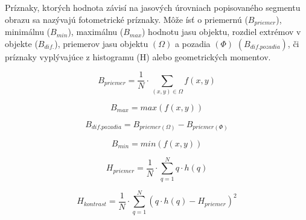         Príznaky, ktorých hodnota závisí na jasových úrovniach popisovaného segmentu obrazu sa nazývajú fotometrické príznaky. Môže ísť o priemernú ($B_{priemer}$), minimálnu ($B_{min}$), maximálnu ($B_{max}$) hodnotu jasu objektu, rozdiel extrémov v objekte ($B_{dif.}$), priemerov jasu objektu $(\Omega)$ a pozadia $(\Phi)$ $(B_{dif. pozadia})$, či príznaky vyplývajúce z histogramu (H) alebo geometrických momentov.

        \begin{figure}[!ht]
            \centering
            \begin{minipage}[b]{0.45\textwidth}
                \begin{equation}
                    B_{priemer} = \frac{1}{N} \cdot \sum_{(x,y) \in \Omega} f(x,y)
                \end{equation}
            \end{minipage}
            \begin{minipage}[b]{0.45\textwidth}
                \begin{equation}
                    B_{max} = max(f(x,y))
                \end{equation}
            \end{minipage}
            \begin{minipage}[b]{0.45\textwidth}
                \begin{equation}
                    B_{dif. pozadia} = B_{priemer(\Omega)} - B_{priemer(\Phi)} 
                \end{equation}
            \end{minipage}
            \begin{minipage}[b]{0.45\textwidth}
                \begin{equation}
                    B_{min} = min(f(x,y))
                \end{equation}
            \end{minipage}
            \begin{minipage}[b]{0.45\textwidth}
                \begin{equation}
                    H_{priemer} = \frac{1}{N} \cdot \sum_{q=1}^{N} q \cdot h(q)
                \end{equation}
            \end{minipage}
            \begin{minipage}[b]{0.5\textwidth}
                \begin{equation}
                    H_{kontrast} = \frac{1}{N} \cdot \sum_{q=1}^{N} (q \cdot h(q) - H_{priemer})^2

\end{equation}
\end{minipage}
\end{figure}
